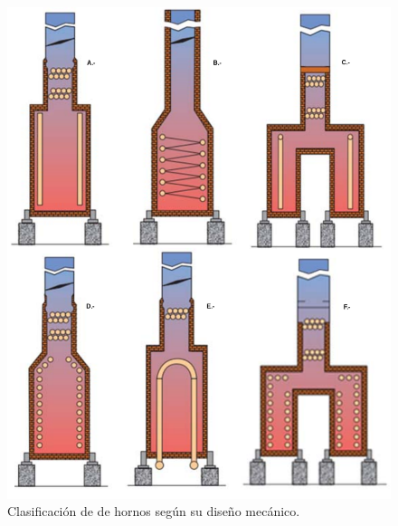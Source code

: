 \begin{figure}[hbt]
\begin{center}
\includegraphics[scale=0.30]{images/hornos_tipos}
\caption[Tipos de hornos por diseño mecánico]{Clasificación de de hornos según su diseño mecánico.\cite{kumar}}
\label{fig:hornos_tipos}
\end{center}
\end{figure}

